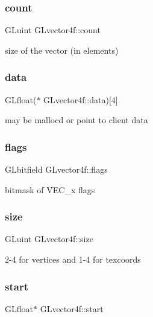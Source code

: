 \subsubsection{\texorpdfstring{count}{count}}
{\footnotesize\ttfamily G\+Luint G\+Lvector4f\+::count}

size of the vector (in elements) \mbox{\label{struct_g_lvector4f_ac4496cfda78d106356b73b4cac41761d}} 
\subsubsection{\texorpdfstring{data}{data}}
{\footnotesize\ttfamily G\+Lfloat($\ast$ G\+Lvector4f\+::data)\mbox{[}4\mbox{]}}

may be malloc\textquotesingle{}d or point to client data \mbox{\label{struct_g_lvector4f_ab10bfdc37b34f053b520f30f13433b08}} 
\subsubsection{\texorpdfstring{flags}{flags}}
{\footnotesize\ttfamily G\+Lbitfield G\+Lvector4f\+::flags}

bitmask of V\+E\+C\+\_\+x flags \mbox{\label{struct_g_lvector4f_ae3421fa4b48cb80b49f81fa5a04fd44f}} 
\subsubsection{\texorpdfstring{size}{size}}
{\footnotesize\ttfamily G\+Luint G\+Lvector4f\+::size}

2-\/4 for vertices and 1-\/4 for texcoords \mbox{\label{struct_g_lvector4f_a37b2bc6b9bda2d1f0bb08485510d0ec4}} 
\subsubsection{\texorpdfstring{start}{start}}
{\footnotesize\ttfamily G\+Lfloat$\ast$ G\+Lvector4f\+::start}

